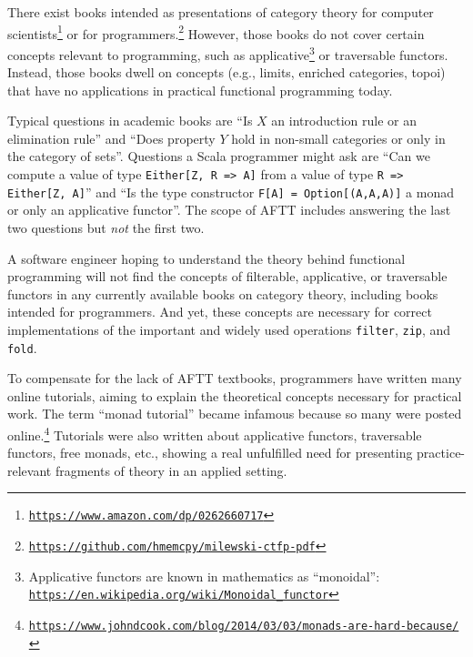 There exist books intended as presentations of category theory for
computer scientists\footnote{\texttt{\href{https://www.amazon.com/dp/0262660717}{https://www.amazon.com/dp/0262660717}}}
or for programmers.\footnote{\texttt{\href{https://github.com/hmemcpy/milewski-ctfp-pdf}{https://github.com/hmemcpy/milewski-ctfp-pdf}}}
However, those books do not cover certain concepts relevant to programming,
such as applicative\footnote{Applicative functors are known in mathematics as \textsf{``}monoidal\textsf{''}: \texttt{\href{https://en.wikipedia.org/wiki/Monoidal_functor}{https://en.wikipedia.org/wiki/Monoidal\_functor}}}
or traversable functors. Instead, those books dwell on concepts (e.g.,
limits, enriched categories, topoi) that have no applications in practical
functional programming today.

Typical questions in academic books are \textsf{``}Is $X$ an introduction
rule or an elimination rule\textsf{''} and \textsf{``}Does property $Y$ hold in non-small
categories or only in the category of sets\textsf{''}. Questions a Scala programmer
might ask are \textsf{``}Can we compute a value of type \lstinline!Either[Z, R => A]!
from a value of type \lstinline!R => Either[Z, A]!\textsf{''} and \textsf{``}Is the
type constructor \lstinline!F[A] = Option[(A,A,A)]! a monad or only
an applicative functor\textsf{''}. The scope of AFTT includes answering the
last two questions but \emph{not} the first two.

A software engineer hoping to understand the theory behind functional
programming will not find the concepts of filterable, applicative,
or traversable functors in any currently available books on category
theory, including books intended for programmers. And yet, these concepts
are necessary for correct implementations of the important and widely
used operations \lstinline!filter!, \lstinline!zip!, and \lstinline!fold!.

To compensate for the lack of AFTT textbooks, programmers have written
many online tutorials, aiming to explain the theoretical concepts
necessary for practical work. The term \textsf{``}monad tutorial\textsf{''} became
infamous because so many were  posted online.\footnote{\texttt{\href{https://www.johndcook.com/blog/2014/03/03/monads-are-hard-because/}{https://www.johndcook.com/blog/2014/03/03/monads-are-hard-because/}}}
Tutorials were also written about applicative functors, traversable
functors, free monads, etc., showing a real unfulfilled need for presenting
practice-relevant fragments of theory in an applied setting. 

